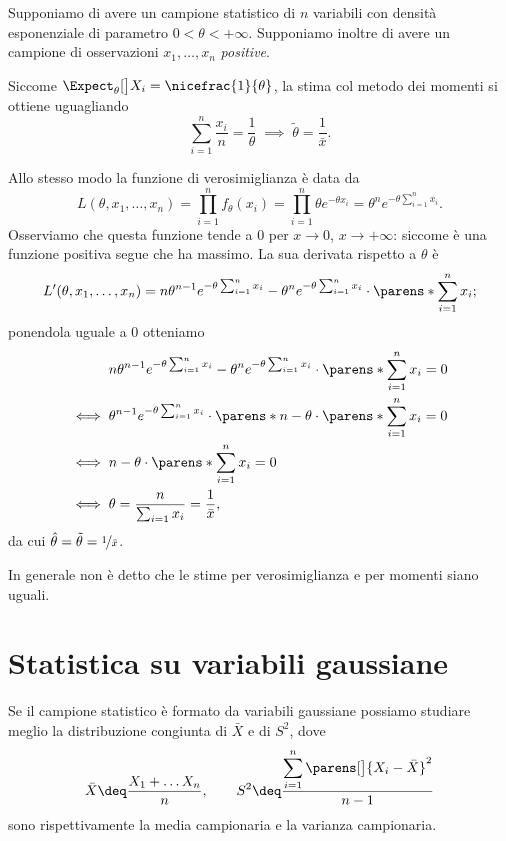 \begin{example}
    Supponiamo di avere un campione statistico di $n$ variabili con densità esponenziale di parametro $0 < \theta < +\infty$. Supponiamo inoltre di avere un campione di osservazioni $x_1, \dots, x_n$ \emph{positive}.

    Siccome $\Expect_{\theta}[\big]{X_i} = \nicefrac{1}{\theta}$, la stima col metodo dei momenti si ottiene uguagliando \[
        \sum_{i=1}^n \frac{x_i}{n} = \frac{1}{\theta} \;\implies\; \tilde\theta = \frac{1}{\bar x}.     
    \]

    Allo stesso modo la funzione di verosimiglianza è data da \[
        L(\theta, x_1, \dots, x_n) = \prod_{i=1}^n f_\theta(x_i) = \prod_{i=1}^n \theta e^{-\theta x_i} = \theta^n e^{-\theta \sum_{i=1}^n x_i}.
    \] Osserviamo che questa funzione tende a $0$ per $x \to 0$, $x \to +\infty$: siccome è una funzione positiva segue che ha massimo. La sua derivata rispetto a $\theta$ è \[
        L'(\theta, x_1, \dots, x_n) = n\theta^{n-1}e^{-\theta\sum_{i=1}^n x_i} - \theta^n e^{-\theta\sum_{i=1}^n x_i} \cdot \parens*{\sum_{i=1}^n x_i};
    \] ponendola uguale a $0$ otteniamo \begin{align*}
        &n\theta^{n-1}e^{-\theta\sum_{i=1}^n x_i} - \theta^n e^{-\theta\sum_{i=1}^n x_i} \cdot \parens*{\sum_{i=1}^n x_i} = 0\\
        \iff {}&\theta^{n-1}e^{-\theta\sum_{i=1}^n x_i} \cdot \parens*{n - \theta \cdot \parens*{\sum_{i=1}^n x_i}} = 0\\
        \iff {}&n - \theta \cdot \parens*{\sum_{i=1}^n x_i} = 0\\
        \iff {}&\theta = \frac{n}{\sum_{i=1} x_i} = \frac{1}{\bar x},
    \end{align*}
    da cui $\hat\theta = \tilde\theta = \nicefrac{1}{\bar x}$.
\end{example}

In generale non è detto che le stime per verosimiglianza e per momenti siano uguali. 

\section{Statistica su variabili gaussiane}

Se il campione statistico è formato da variabili gaussiane possiamo studiare meglio la distribuzione congiunta di $\bar X$ e di $S^2$, dove \[
    \bar X \deq \frac{X_1 + \dots X_n}{n}, \qquad S^2 \deq \frac{\displaystyle \sum_{i=1}^n \parens[\big]{X_i - \bar X}^2}{n-1}    
\] sono rispettivamente la media campionaria e la varianza campionaria.

